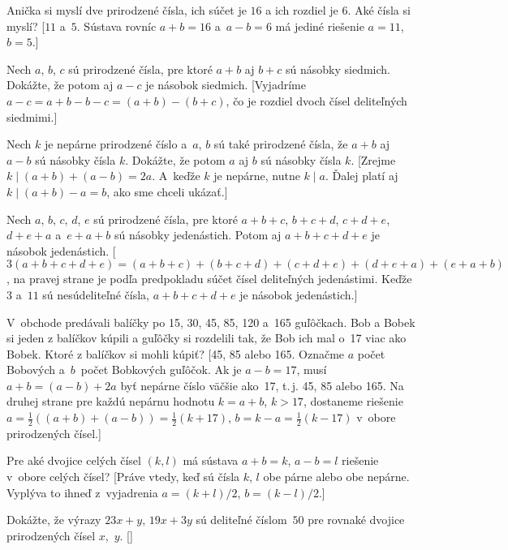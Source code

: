 {

Anička si myslí dve prirodzené čísla, ich súčet je $16$ a ich rozdiel je $6$. Aké čísla si myslí? [$11$ a~$5$. Sústava rovníc $a+b =16$ a~$a-b=6$ má jediné riešenie $a=11$, $b = 5$.]

Nech $a$, $b$, $c$ sú prirodzené čísla, pre ktoré $a+b$ aj $b+c$ sú násobky siedmich. Dokážte, že potom aj $a-c$ je násobok siedmich. [Vyjadríme $a-c = a+b - b -c = (a+b) - (b+c)$, čo je rozdiel dvoch čísel deliteľných siedmimi.]

Nech $k$ je nepárne prirodzené číslo a~$a$, $b$ sú také prirodzené čísla, že $a+b$ aj $a-b$ sú násobky čísla $k$. Dokážte, že potom $a$ aj $b$ sú násobky čísla $k$. [Zrejme $k\mid (a+b)+(a-b)=2a$. A~keďže $k$ je nepárne, nutne $k\mid a$. Ďalej platí aj $k\mid (a+b)-a =b$, ako sme chceli ukázať.]

Nech $a$, $b$, $c$, $d$, $e$ sú prirodzené čísla, pre ktoré $a+b+c$, $b+c+d$, $c+d+e$, $d+e+a$ a~$e+a+b$ sú násobky jedenástich. Potom aj $a+b+c+d+e$ je násobok jedenástich. [$3(a+b+c+d+e) =(a+b+c)+( b+c+d )+(c+d+e)+( d+e+a)+( e+a +b)$, na pravej strane je podľa predpokladu súčet čísel deliteľných jedenástimi. Keďže $3$ a~$11$ sú nesúdeliteľné čísla, $a+b+c+d+e$ je násobok jedenástich.]


\D
V~obchode predávali balíčky po 15, 30, 45, 85, 120 a~165 guľôčkach. Bob a Bobek si jeden z balíčkov kúpili a guľôčky si rozdelili tak, že Bob ich mal o~17 viac ako Bobek. Ktoré z balíčkov si mohli kúpiť? [45, 85 alebo 165. Označme $a$ počet Bobových a~$b$~počet Bobkových guľôčok. Ak je $a-b=17$, musí $a+b=(a-b)+2a$ byť nepárne číslo väčšie ako~17, t.\,j. 45, 85 alebo 165. Na druhej strane pre každú nepárnu hodnotu $k=a+b$, $k>17$, dostaneme riešenie $a=\frac12((a+b)+(a-b))=\frac12(k+17)$, $b=k-a = \frac12(k-17)$ v~obore prirodzených čísel.]

Pre aké dvojice celých čísel $(k,l)$ má sústava $a+b=k$, $a-b=l$ riešenie v~obore celých čísel? [Práve vtedy, keď sú čísla $k$, $l$ obe párne alebo obe nepárne. Vyplýva to ihneď z~vyjadrenia $a={(k+l)}/2$, $b={(k-l)}/2$.]

Dokážte, že výrazy $23x + y$, $19x + 3y$ sú deliteľné číslom~$50$ pre rovnaké dvojice prirodzených čísel $x$,~$y$. []

}
